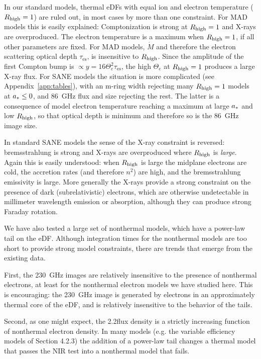 In our standard models, thermal eDFs with equal ion and electron temperature ($R_\mathrm{high} = 1$) are ruled out, in most cases by more than one constraint.  For MAD models this is easily explained: Comptonization is strong at $R_\mathrm{high} = 1$ and X-rays are overproduced.  The electron temperature is a maximum when $R_\mathrm{high} = 1$, if all other parameters are fixed. For MAD models, $\dot{M}$ and therefore the electron scattering optical depth $\tau_\mathrm{es}$, is insensitive to $R_\mathrm{high}$.  Since the amplitude of the first Compton bump is $\propto y = 16 \Theta_e^2 \tau_\mathrm{es}$, the high $\Theta_e$ at $R_\mathrm{high} = 1$ produces a large X-ray flux.  For SANE models the situation is more complicated (see Appendix~\ref{app:tables}), with an m-ring width rejecting many $R_\mathrm{high} = 1$ models at $a_* \le 0$, and 86~GHz flux and size rejecting the rest.  The latter is a consequence of model electron temperature reaching a maximum at large $a_*$ and low $R_\mathrm{high}$, so that optical depth is minimum and therefore so is the 86~GHz image size.

In standard SANE models the sense of the X-ray constraint is reversed: bremsstrahlung is strong and X-rays are overproduced where $R_\mathrm{high}$ is {\em large}.  Again this is easily understood: when $R_\mathrm{high}$ is large the midplane electrons are cold, the accretion rates (and therefore $n^2$) are high, and the bremsstrahlung emissivity is large.  More generally the X-rays provide a strong constraint on the presence of dark (subrelativistic) electrons, which are otherwise undetectable in millimeter wavelength emission or absorption, although they can produce strong Faraday rotation.

We have also tested a large set of nonthermal models, which have a power-law tail on the eDF.  Although integration times for the nonthermal models are too short to provide strong model constraints, there are trends that emerge from the existing data.

First, the 230~GHz images are relatively insensitive to the presence of nonthermal electrons, at least for the nonthermal electron models we have studied here.  This is encouraging: the 230~GHz image is generated by electrons in an approximately thermal core of the eDF, and is relatively insensitive to the behavior of the tails.

Second, as one might expect, the 2.2\um flux density is a strictly increasing function of nonthermal electron density.  In many models (e.g. the variable efficiency models of Section 4.2.3) the addition of a power-law tail changes a thermal model that passes the NIR test into a nonthermal model that fails.

